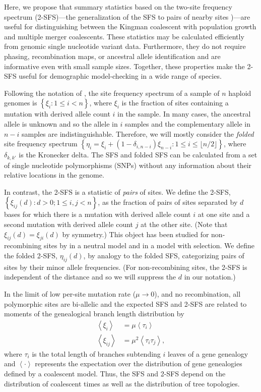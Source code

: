 \documentclass[11pt, letterpaper]{article}   	%
\newcommand{\floor}[1]{\lfloor #1 \rfloor}
\newcommand{\E}[1]{\left< #1 \right>}
\begin{document}
Here, we propose that summary statistics based on the two-site frequency spectrum (2-SFS)---the generalization of the SFS to pairs of nearby sites \autocite{Hudson2001, FerrettiEtAl2018})---are useful for distinguishing between the Kingman coalescent with population growth and multiple merger coalescents.
These statistics may be calculated efficiently from genomic single nucleotide variant data.
Furthermore, they do not require phasing, recombination maps, or ancestral allele identification and are informative even with small sample sizes.
Together, these properties make the 2-SFS useful for demographic model-checking in a wide range of species.

Following the notation of \cite{Fu1995}, the site frequency spectrum of a sample of $n$ haploid genomes is $\left\{ \xi_i : 1 \leq i < n \right\}$, where $\xi_i$ is the fraction of sites containing a mutation with derived allele count $i$ in the sample.
In many cases, the ancestral allele is unknown and so the allele in $i$ samples and the complementary allele in $n-i$ samples are indistinguishable.
Therefore, we will mostly consider the \textit{folded} site frequency spectrum $\left\{ \eta_i = \xi_i + (1-\delta_{i,n-i}) \xi_{n-i}: 1 \leq i \leq \floor{n/2} \right\}$, where $\delta_{k,k'}$ is the Kronecker delta. %
The SFS and folded SFS can be calculated from a set of single nucleotide polymorphisms (SNPs) without any information about their relative locations in the genome.

In contrast, the 2-SFS is a statistic of \textit{pairs} of sites.
We define the 2-SFS,
$\left\{ \xi_{ij}(d) : d > 0; 1 \leq i, j < n\right\}$,
as the fraction of pairs of sites separated by $d$ bases for which there is a mutation with derived allele count $i$ at one site and a second mutation with derived allele count $j$ at the other site.
(Note that $\xi_{ij}(d) = \xi_{ji}(d)$ by symmetry.)
This object has been studied for non-recombining sites by \cite{FerrettiEtAl2018} in a neutral model and \cite{Xie2011} in a model with selection.
We define the folded 2-SFS, $\eta_{ij}(d)$, by analogy to the folded SFS,  categorizing pairs of sites by their minor allele frequencies. (For non-recombining sites, the 2-SFS is independent of the distance and so we will suppress the $d$ in our notation.)

In the limit of low per-site mutation rate ($\mu\to0$), and no recombination, all polymorphic sites are bi-allelic and the expected SFS and 2-SFS are related to moments of the genealogical branch length distribution by
\begin{align}
    \E{\xi_i} &= \mu \E{\tau_i} \label{eq:expected_sfs} \\
    \E{\xi_{ij}} &= \mu^2 \E{\tau_i \tau_j},
    \label{eq:expected_2sfs}
\end{align}
where $\tau_i$ is the total length of branches subtending $i$ leaves of a gene genealogy and $\E{\cdot}$ represents the expectation over the distribution of gene genealogies defined by a coalescent model.
Thus, the SFS and 2-SFS depend on the distribution of coalescent times as well as the distribution of tree topologies.
\end{document}
